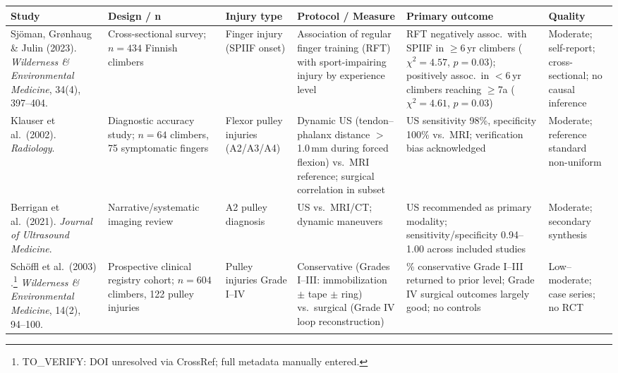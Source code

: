 \begin{longtable}{>{\raggedright\arraybackslash}p{3.8cm}
                  >{\raggedright\arraybackslash}p{2.8cm}
                  >{\raggedright\arraybackslash}p{2.2cm}
                  >{\raggedright\arraybackslash}p{3.5cm}
                  >{\raggedright\arraybackslash}p{3.2cm}
                  >{\raggedright\arraybackslash}p{2.2cm}}
\toprule
\textbf{Study} & \textbf{Design / n} & \textbf{Injury type} & \textbf{Protocol / Measure} & \textbf{Primary outcome} & \textbf{Quality} \\
\midrule
\endhead
\bottomrule
\endfoot

Sjöman, Grønhaug \& Julin (2023). \textit{Wilderness \& Environmental Medicine}, 34(4), 397--404. \cite{O23}
& Cross-sectional survey; $n=434$ Finnish climbers
& Finger injury (SPIIF onset)
& Association of regular finger training (RFT) with sport-impairing injury by experience level
& RFT negatively assoc.\ with SPIIF in $\geq$6\,yr climbers ($\chi^2=4.57$, $p=0.03$); positively assoc.\ in $<$6\,yr climbers reaching $\geq$7a ($\chi^2=4.61$, $p=0.03$)
& Moderate; self-report; cross-sectional; no causal inference \\

\addlinespace

Klauser et al.\ (2002). \textit{Radiology}. \cite{KFBE02}
& Diagnostic accuracy study; $n=64$ climbers, 75 symptomatic fingers
& Flexor pulley injuries (A2/A3/A4)
& Dynamic US (tendon--phalanx distance $>$1.0\,mm during forced flexion) vs.\ MRI reference; surgical correlation in subset
& US sensitivity 98\%, specificity 100\% vs.\ MRI; verification bias acknowledged
& Moderate; reference standard non-uniform \\

\addlinespace

Berrigan et al.\ (2021). \textit{Journal of Ultrasound Medicine}. \cite{BWCE21}
& Narrative/systematic imaging review
& A2 pulley diagnosis
& US vs.\ MRI/CT; dynamic maneuvers
& US recommended as primary modality; sensitivity/specificity 0.94--1.00 across included studies
& Moderate; secondary synthesis \\

\addlinespace

Sch\"{o}ffl et al.\ (2003) \cite{SHWS03}.\footnote{TO\_VERIFY: DOI unresolved via CrossRef; full metadata manually entered.} \textit{Wilderness \& Environmental Medicine}, 14(2), 94--100.
& Prospective clinical registry cohort; $n=604$ climbers, 122 pulley injuries
& Pulley injuries Grade I--IV
& Conservative (Grades I--III: immobilization $\pm$ tape $\pm$ ring) vs.\ surgical (Grade IV loop reconstruction)
& 92\% conservative Grade I--III returned to prior level; Grade IV surgical outcomes largely good; no controls
& Low--moderate; case series; no RCT \\


\end{longtable}
